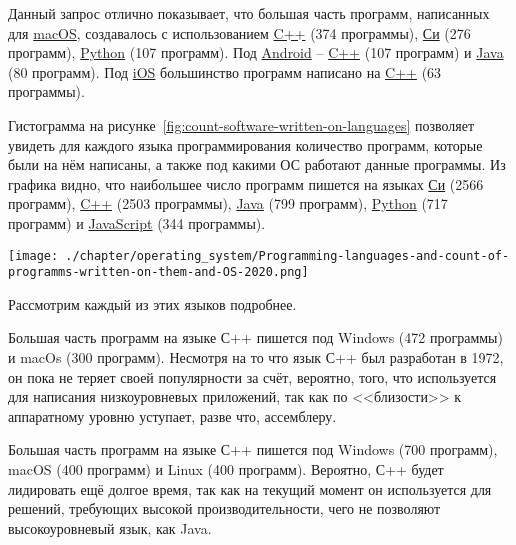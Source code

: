 Данный запрос отлично показывает, что большая часть программ, написанных для \href{https://www.wikidata.org/wiki/Q14116}{macOS}, создавалось с использованием \href{https://www.wikidata.org/wiki/Q2407}{C++} (374 программы), \href{https://www.wikidata.org/wiki/Q15777}{Си} (276 программ), \href{https://www.wikidata.org/wiki/Q28865}{Python} (107 программ).
Под \href{https://www.wikidata.org/wiki/Q94}{Android} -- \href{https://www.wikidata.org/wiki/Q2407}{C++} (107 программ) и \href{https://www.wikidata.org/wiki/Q251}{Java} (80 программ).
Под \href{https://www.wikidata.org/wiki/Q48493}{iOS} большинство программ написано на \href{https://www.wikidata.org/wiki/Q2407}{C++} (63 программы).

Гистограмма на рисунке~\ref{fig:count-software-written-on-languages} позволяет увидеть для каждого языка программирования количество программ, которые были на нём написаны, а также под какими ОС работают данные программы. Из графика видно, что наибольшее число программ пишется на языках \href{https://www.wikidata.org/wiki/Q15777}{Си} (2566 программ), \href{https://www.wikidata.org/wiki/Q2407}{C++} (2503 программы), \href{https://www.wikidata.org/wiki/Q251}{Java} (799 программ), \href{https://www.wikidata.org/wiki/Q28865}{Python} (717 программ) и \href{https://www.wikidata.org/wiki/Q2005}{JavaScript} (344 программы).

\begin{figure*}[h!]
	\texttt{[image: ./chapter/operating\_system/Programming-languages-and-count-of-programms-written-on-them-and-OS-2020.png]}
	\caption{Языки программирования и количество ОС, под которыми работают программы, написанные на этих языках, 2020 год.}
	\label{fig:count-software-written-on-languages}
\end{figure*}

Рассмотрим каждый из этих языков подробнее.

Большая часть программ на языке С++ пишется под Windows (472 программы) и macOs (300 программ). Несмотря на то что язык С++ был разработан в 1972, он пока не теряет своей популярности за счёт, вероятно, того, что используется для написания низкоуровневых приложений, так как по <<близости>> к аппаратному уровню уступает, разве что, ассемблеру.

Большая часть программ на языке С++ пишется под Windows (700 программ), macOS (400 программ) и Linux (400 программ). Вероятно, С++ будет лидировать ещё долгое время, так как на текущий момент он используется для решений, требующих высокой производительности, чего не позволяют высокоуровневый язык, как Java\cite{lang_performance}.

